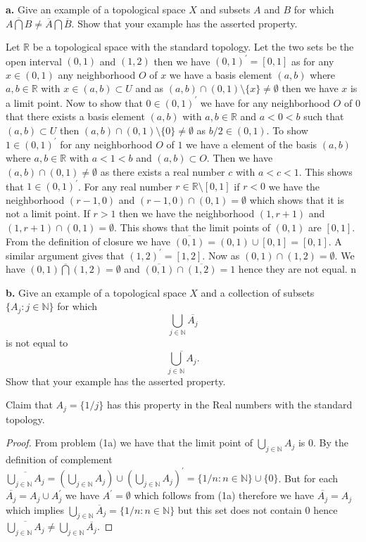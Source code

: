 \documentclass{amsart}
\theoremstyle{plain}
\theoremstyle{definition}
\theoremstyle{remark}
\begin{document}
\vspace{.1in}
{\bfseries a.} Give an example of a topological space $X$ and subsets $A$ and $B$ for which $\overline{A\bigcap B} \ne \overline{A} \bigcap \overline{B}$. Show that your example has the asserted property. 

Let $\mathbb{R}$ be a topological space with the standard topology. Let the two sets be the open interval $(0,1)$ and $(1,2)$ then we have $(0,1)^\prime=[0,1]$ as for any $x\in (0,1)$ any neighborhood $O$ of $x$ we have a basis element $(a,b)$ where $a,b\in \mathbb{R}$ with $x\in (a,b)\subset U$ and as $(a,b)\cap (0,1)\setminus \{x\}\not = \emptyset$ then we have $x$ is a limit point. Now to show that $0\in (0,1)^\prime$ we have for any neighborhood $O$ of $0$ that there exists a basis element $(a,b)$ with $a,b\in \mathbb R$ and $a<0<b$ such that $(a,b)\subset U$ then $(a,b)\cap (0,1)\setminus \{0\}\not = \emptyset$ as $b/2\in (0,1)$. To show $1\in (0,1)^\prime$ for any neighborhood $O$ of $1$ we have a element of the basis $(a,b)$ where $a,b\in \mathbb{R}$ with $a<1<b$ and $(a,b)\subset O$. Then we have $(a,b)\cap (0,1)\not = \emptyset$ as there exists a real number $c$ with $a<c<1$. This shows that $1\in (0,1)^\prime$. For any real number $r\in \mathbb{R}\setminus [0,1]$ if $r<0$ we have the neighborhood $(r-1,0)$ and $(r-1,0)\cap (0,1)= \emptyset$ which shows that it is not a limit point. If $r>1$ then we have the neighborhood $(1,r+1)$ and $(1,r+1)\cap (0,1)=\emptyset$. This shows that the limit points of $(0,1)$ are $[0,1]$. From the definition of closure we have $\overline {(0,1)}= (0,1)\cup [0,1]=[0,1]$. A similar argument gives that $(1,2)^\prime=[1,2]$. Now as $(0,1)\cap (1,2)=\emptyset$. We have $\overline{(0,1)\bigcap (1,2)}=\emptyset$ and $\overline{(0,1)}\cap \overline{(1,2)}={1}$ hence they are not equal. n



\vspace{.1in}
{\bfseries b.} Give an example of a topological space $X$ and a collection of subsets $\{ A_j : j\in \mathbb N \}$ for which 
\[
\bigcup _{j\in \mathbb N } \overline{A_j}
\]
is not equal to 
\[
\overline{\bigcup _{j\in \mathbb N } A_j}.
\]
Show that your example has the asserted property. 

Claim that $A_j=\{1/j\}$ has this property in the Real numbers with the standard topology.

\begin{proof}
    From problem (1a) we have that the limit point of $\bigcup_{j\in \mathbb{N}}A_j$ is ${0}$. By the definition of complement $\overline {\bigcup_{j\in \mathbb{N}}A_j}=(\bigcup_{j\in \mathbb{N}}A_j) \cup (\bigcup_{j\in \mathbb{N}}A_j)^\prime=\{1/n:n\in \mathbb{N}\}\cup \{0\}$. But for each $\overline {A_j}=A_j\cup A_j^\prime$ we have $A^\prime=\emptyset$ which follows from (1a) therefore we have $\overline{A_j}=A_j$ which implies $\bigcup_{j\in \mathbb{N}}\overline A_j=\{1/n:n\in \mathbb{N}\}$ but this set does not contain $0$ hence $\overline {\bigcup_{j\in \mathbb{N}}A_j}\not = \bigcup_{j\in \mathbb{N}}\overline{A_j}$. 
\end{proof}
\end{document}

